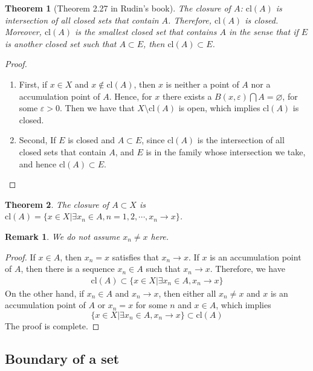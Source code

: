 \documentclass[12pt,leqno]{amsart}
\newtheorem{theorem}{Theorem}[section]
\newtheorem{remark}{Remark}[section]
\theoremstyle{definition}
\numberwithin{equation}{subsection}
\begin{document}
\begin{theorem}[Theorem 2.27 in Rudin's book]
The closure of $A$: $\text{cl}(A)$ is intersection of all closed sets that contain $A$. Therefore, $\text{cl}(A)$ is closed. Moreover, $\text{cl}(A)$ is the smallest closed set that contains $A$ in the sense that if $E$ is another closed set such that $A\subset E$, then $\text{cl}(A)\subset E$.
\end{theorem}
\begin{proof}
~\begin{enumerate}
    \item First, if $x\in X$ and $x\notin \text{cl}(A)$, then $x$ is neither a point of $A$ nor a accumulation point of $A$. Hence, for $x$ there exists a $B(x,\varepsilon) \bigcap A = \varnothing$, for some $\varepsilon > 0$. Then we have that $X\setminus \text{cl}(A)$ is open, which implies $\text{cl}(A)$ is closed.
    \item Second, If $E$ is closed and $A\subset E$, since $\text{cl}(A)$ is the intersection of all closed sets that contain $A$, and $E$ is in the family whose intersection we take, and hence $\text{cl}(A)\subset E$.
\end{enumerate}
\end{proof}

\medskip

\begin{theorem}
The closure of $A\subset X$ is $\text{cl}(A) = \{x\in X|\exists x_n\in A, n = 1,2,\cdots, x_n\to x\}$.
\end{theorem}
\begin{remark}
We do not assume $x_n \neq x$ here.
\end{remark}
\begin{proof}
If $x\in A$, then $x_n = x$ satisfies that $x_n\to x$. If $x$ is an accumulation point of $A$, then there is a sequence $x_n\in A$ such that $x_n\to x$. Therefore, we have 
\begin{align*}
    \text{cl}(A) \subset \{x\in X|\exists x_n\in A,  x_n\to x\}
\end{align*}
On the other hand, if $x_n\in A$ and $x_n\to x$, then either all $x_n \neq x$ and $x$ is an accumulation point of $A$ or $x_n  = x$ for some $n$ and $x\in A$, which implies $$\{x\in X|\exists x_n\in A,  x_n\to x\}\subset \text{cl}(A)$$
The proof is complete.
\end{proof}

\medskip

\subsection{Boundary of a set}
\end{document}
